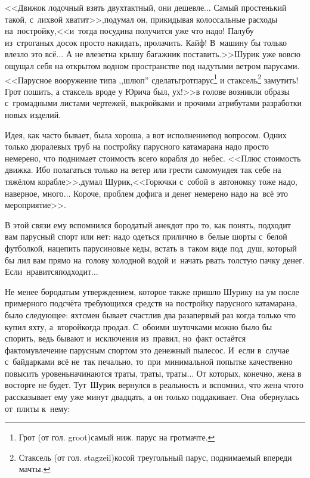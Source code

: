 {<<Движок лодочный взять двухтактный, они дешевле$\ldots$ Самый простенький такой, с~лихвой хватит>>,\mdash подумал он, прикидывая колоссальные расходы на~постройку,\mdash <<и~тогда посудина получится уже что надо! Палубу из~строганых досок просто накидать, пролачить. Кайф! В~машину бы только влезло это всё$\ldots$ А не влезет\mdash на крышу багажник поставить.>>\mdash Шурик уже вовсю ощущал себя на открытом водном пространстве под надутыми ветром парусами. <<Парусное вооружение типа ,,шлюп'' сделать\mdash грот\sdash парус\footnote{Грот (от гол. groot)\mdash самый ниж. парус на грот\sdash мачте.} и стаксель\footnote{Стаксель (от гол. stagzeil)\mdash косой треугольный парус, поднимаемый впереди мачты.} замутить! Грот пошить, а стаксель вроде у Юрича был, ух!>>\mdash в голове возникли образы с~громадными листами чертежей, выкройками и прочими атрибутами разработки новых изделий.

Идея, как часто бывает, была хороша, а вот исполнение\mdash под вопросом. Одних только дюралевых труб на постройку парусного катамарана надо просто немерено, что поднимает стоимость всего корабля до~небес. <<Плюс стоимость движка. Ибо полагаться только на ветер или грести самому\mdash идея так себе на тяжёлом корабле>>.\mdash думал Шурик,\mdash <<Горючки с~собой в~автономку тоже надо, наверное, много$\ldots$ Короче, проблем дофига и денег немерено надо на~всё это мероприятие>>. 

В этой связи ему вспомнился бородатый анекдот про то, как понять, подходит вам парусный спорт или нет: надо одеться прилично в~белые шорты с~белой футболкой, нацепить парусиновые кеды, встать в~таком виде под~душ, который бы лил вам прямо на~голову холодной водой и~начать рвать толстую пачку денег. Если~нравится\mdash подходит$\ldots$

Не менее бородатым утверждением, которое также пришло Шурику на ум после примерного подсчёта требующихся средств на постройку парусного катамарана, было следующее: яхтсмен бывает счастлив два раза\mdash первый раз когда только что купил яхту, а~второй\mdash когда продал. С~обоими шуточками можно было бы спорить, ведь бывают и~исключения из~правил, но~факт остаётся фактом\mdash увлечение парусным спортом это денежный пылесос. И~если в~случае с~байдарками всё не~так печально, то~при~минимальной попытке качественно повысить уровень\mdash начинаются траты, траты, траты$\ldots$ От которых, конечно, жена в восторге не будет. Тут~Шурик вернулся в реальность и вспомнил, что жена что\sdash то рассказывает ему уже минут двадцать, а он только поддакивает. Она~обернулась от~плиты к~нему:

}
